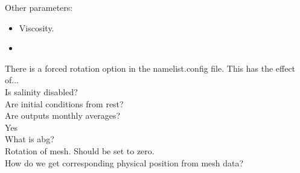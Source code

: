 \documentclass[10pt]{article}
\begin{document}
Other parameters:
\begin{itemize}
	\item Viscosity.
	\item 
\end{itemize}
There is a forced rotation option in the namelist.config file. This has the effect of...\\
\linebreak
Is salinity disabled?\\
\linebreak
Are initial conditions from rest?\\
\linebreak
Are outputs monthly averages?\\
Yes\\
\linebreak
What is abg?\\
Rotation of mesh. Should be set to zero. \\
\linebreak
How do we get corresponding physical position from mesh data?
\end{document}
